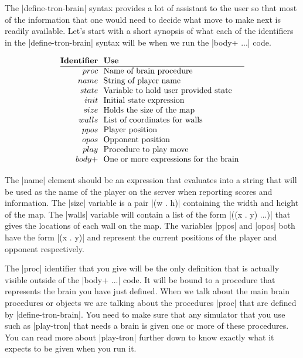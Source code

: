The |define-tron-brain| syntax provides a lot of assistant to the user 
so that most of the information that one would need to decide what move 
to make next is readily available. Let's start with a short synopsis 
of what each of the identifiers in the |define-tron-brain| syntax will 
be when we run the |body+ ...| code.

$$\vbox{
  \offinterlineskip
  \halign{
    \strut # & # \hfill\cr
    {\bf Identifier} & {\bf Use} \cr
    \noalign{\hrule}
    $\\{proc}$  & Name of brain procedure \cr
    $\\{name}$  & String of player name \cr
    $\\{state}$ & Variable to hold user provided state \cr
    $\\{init}$  & Initial state expression \cr
    $\\{size}$  & Holds the size of the map \cr
    $\\{walls}$ & List of coordinates for walls \cr
    $\\{ppos}$  & Player position \cr
    $\\{opos}$  & Opponent position \cr
    $\\{play}$  & Procedure to play move \cr
    $\\{body+}$ & One or more expressions for the brain \cr
  }
}$$

\noindent The |name| element should be an expression that evaluates into a
string that will be used as the name of the player on the server when
reporting scores and information. The |size| variable is a pair 
|(w . h)| containing the width and height of the map. The |walls|
variable will contain a list of the form |((x . y) ...)|
that gives the locations of each wall on the map. The variables |ppos|
and |opos| both have the form |(x . y)| and represent the current
positions of the player and opponent respectively. 


The |proc| identifier that you give will be the only definition that 
is actually visible outside of the |body+ ...| code. It will be bound to 
a procedure that represents the brain you have just defined. When we talk 
about the main brain procedures or objects we are talking about the procedures 
|proc| that are defined by |define-tron-brain|. You need to make sure that
any simulator that you use such as |play-tron| that needs a brain is given 
one or more of these procedures. You can read more about |play-tron| further 
down to know exactly what it expects to be given when you run it.

